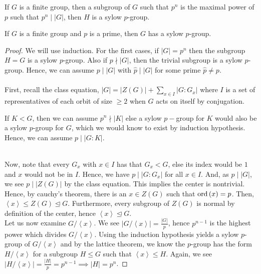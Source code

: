 \begin{recall}
	If \(G\) is a finite group, then a subgroup of \(G\) such that \(p^{n}\) is the maximal power of \(p\) such that \(p^{n} \mid \left| G \right| \), then \(H\) is a sylow \(p\)-group.
\end{recall}
\begin{theorem}
	If \(G\) is a finite group and \(p\) is a prime, then \(G\) has a sylow \(p\)-group.
\end{theorem}
\begin{proof}
	We will use induction. For the first cases, if \(\left| G \right|  = p^{n}\) then the subgroup \(H = G\) is a sylow \(p\)-group. Also if \(p \nmid \left| G \right| \), then the trivial subgroup is a sylow \(p\)-group. Hence, we can assume \(p \mid \left| G \right| \) with \(\hat{p} \mid \left| G \right| \) for some prime \(\hat{p} \neq p\).\\ \\
	First, recall the class equation, \(\left| G \right|  = \left| Z\left( G \right)  \right|  + \sum_{x \in I}^{}\left| G : G_{x} \right| \) where \(I\) is a set of representatives of each orbit of size \(\ge 2\) when \(G\) acts on itself by conjugation.
	\begin{observation}
		If \(K < G\), then we can assume \(p^{n} \nmid \left| K \right| \) else a sylow \(p-\)group for \(K\) would also be a sylow \(p\)-group for \(G\), which we would know to exist by induction hypothesis. Hence, we can assume \(p \mid \left| G : K \right| \).
	\end{observation}
	\\ Now, note that every \(G_{x}\) with \(x \in I\) has that \(G_{x} < G\), else its index would be \(1\) and \(x\) would not be in \(I\). Hence, we have \(p \mid \left| G : G_{x} \right| \) for all \(x \in I\). And, as  \( p \mid \left|  G \right| \), we see \(p \mid \left| Z\left( G \right)  \right| \) by the class equation. This implies the center is nontrivial.\\
	Hence, by cauchy's theorem, there is an \(x \in Z\left( G \right) \) such that \(\operatorname{ord} \left( x \right) = p\). Then, \(\left< x \right>  \le Z\left( G \right)  \trianglelefteq G\). Furthermore, every subgroup of \(Z\left( G \right) \) is normal by definition of the center, hence \(\left<x \right>  \trianglelefteq G\). \\
	Let us now examine \(G / \left<x \right> \). We see \(\left| G / \left<x \right>  \right| = \frac{\left| G \right| }{p}\), hence \(p^{n-1}\) is the highest power which divides \(G / \left<x \right> \). Using the induction hypothesis yields a sylow \(p\)-group of \(G / \left<x \right> \) and by the lattice theorem, we know the \(p\)-group has the form \(H / \left<x \right> \) for a subgroup \(H \le G\) such that \(\left<x \right> \le H\). Again, we see \(\left| H / \left<x \right>  \right| = \frac{\left| H \right| }{p} = p^{n-1} \implies \left| H \right|  = p^{n}\).
\end{proof}
